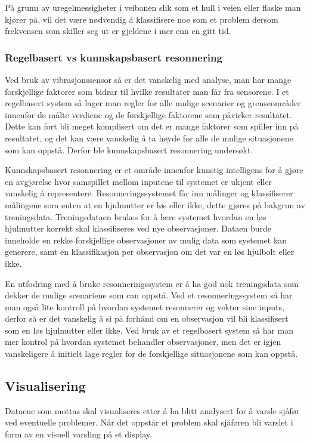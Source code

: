 På grunn av uregelmessigheter i veibanen slik som et hull i veien eller flaske 
man kjører på, vil det være nødvendig å klassifisere noe som et problem dersom 
frekvensen som skiller seg ut er gjeldene i mer enn en gitt tid.

\subsubsection{Regelbasert vs kunnskapsbasert resonnering}
Ved bruk av vibrasjonssensor så er det vanskelig med analyse, man har mange 
forskjellige faktorer som bidrar til hvilke resultater man får fra sensorene.
I et regelbasert system så lager man regler for alle mulige scenarier og 
grenseområder innenfor de målte verdiene og de forskjellige faktorene som 
påvirker resultatet. Dette kan fort bli meget komplisert om det er mange faktorer 
som spiller inn på resultatet, og det kan være vanskelig å ta høyde for alle de 
mulige situasjonene som kan oppstå. Derfor ble kunnskapsbasert resonnering undersøkt. 


Kunnskapsbasert resonnering er et område innenfor kunstig intelligens for å gjøre 
en avgjørelse hvor samspillet mellom inputene til systemet er ukjent eller vanskelig 
å representere. Resonneringssystemet får inn målinger og klassifiserer målingene 
som enten at en hjulmutter er løs eller ikke, dette gjøres på bakgrun av treningsdata. 
Treningsdataen brukes for å lære systemet hvordan en løs hjulmutter korrekt skal 
klassifiseres ved nye observasjoner. Dataen burde inneholde en rekke forskjellige 
observasjoner av mulig data som systemet kan generere, samt en klassifikasjon per 
observasjon om det var en løs hjulbolt eller ikke.

En utfodring med å bruke resonneringssystem er å ha god nok treningsdata som 
dekker de mulige scenariene som can oppstå. Ved et resonneringssystem så har 
man også lite kontroll på hvordan systemet resonnerer og vekter sine inputs, derfor 
så er det vanskelig å si på forhånd om en observasjon vil bli klassifisert som en løs 
hjulmutter eller ikke. Ved bruk av et regelbasert system så har man mer kontrol på 
hvordan systemet behandler observasjoner, men det er igjen vanskeligere å initielt 
lage regler for de forskjellige situasjonene som kan oppstå.

\subsection{Visualisering}
Dataene som mottas skal visualiseres etter å ha blitt analysert for å varsle 
sjåfør ved eventuelle problemer. Når det oppstår et problem skal sjåføren bli 
varslet i form av en visuell varsling på et display.

